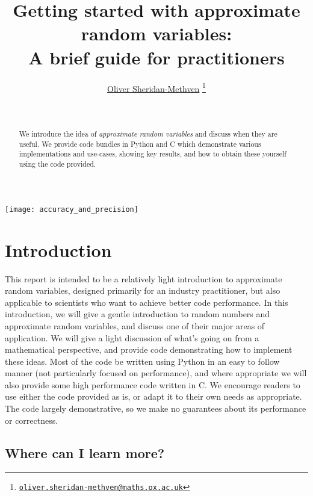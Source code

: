 \documentclass[11pt,a4paper,oneside,english]{extarticle}
\title{Getting started with approximate random variables:\\ A brief guide for practitioners}
\author{\href{mailto:oliver.sheridan-methven@maths.ox.ac.uk}{Oliver Sheridan-Methven}%
\thanks{\href{mailto:oliver.sheridan-methven@maths.ox.ac.uk}%
{\texttt{oliver.sheridan-methven@maths.ox.ac.uk}}}
}
\date{\datedayname\ \nth{\number\day} \monthname\  \number\year}
\begin{document}
\linenumbers
\maketitle
{}

\begin{abstract}
We introduce the idea of \emph{approximate random variables} and discuss when they are useful. We provide code bundles in Python and C which demonstrate various implementations and use-cases, showing key results, and how to obtain these yourself using the code provided.  
\end{abstract}


\vfill
\centerline{\texttt{[image: accuracy\_and\_precision]}}
\vfill

\clearpage
\tableofcontents
\clearpage

\section{Introduction}

This report is intended to be a relatively light introduction to approximate random variables, designed primarily for an industry practitioner, but also applicable to scientists who want to achieve better code performance. In this introduction, we will give a gentle introduction to random numbers and approximate random variables, and discuss one of their major areas of application. We will give a light discussion of what's going on from a mathematical perspective, and provide code demonstrating how to implement these ideas. Most of the code be written using Python in an easy to follow manner (not particularly focused on performance), and where appropriate we will also provide some high performance code written in C. We encourage readers to use either the code provided as is, or adapt it to their own needs as appropriate. The code largely demonstrative, so we make no guarantees about its performance or correctness. 

\subsection{Where can I learn more?}
\label{sec:where_can_i_learn_more}
\end{document}
